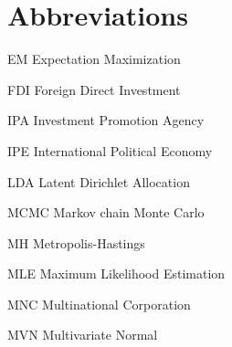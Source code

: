 \abbreviations





\section*{Abbreviations}

\begin{symbollist}
  \item[EM] Expectation Maximization
	\item[FDI] Foreign Direct Investment
  \item[IPA] Investment Promotion Agency
  \item[IPE] International Political Economy
    \item[LDA] Latent Dirichlet Allocation
	\item[MCMC] Markov chain Monte Carlo
  \item[MH] Metropolis-Hastings
	\item[MLE] Maximum Likelihood Estimation
  \item[MNC] Multinational Corporation
  \item[MVN] Multivariate Normal
\end{symbollist}
